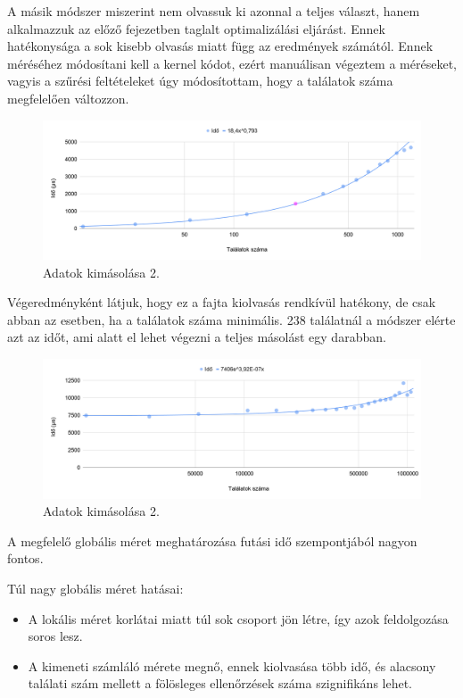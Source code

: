 A másik módszer miszerint nem olvassuk ki azonnal a teljes választ, hanem alkalmazzuk az előző fejezetben taglalt optimalizálási eljárást.
Ennek hatékonysága a sok kisebb olvasás miatt függ az eredmények számától. Ennek méréséhez módosítani kell a kernel kódot, ezért manuálisan végeztem a méréseket, vagyis a szűrési feltételeket úgy módosítottam, hogy a találatok száma megfelelően változzon.

\begin{figure}[h!]
\centering
\includegraphics[width=\textwidth]{images/outpuffer2.png}
\caption{Adatok kimásolása 2.}
\label{fig:schema}
\end{figure}

Végeredményként látjuk, hogy ez a fajta kiolvasás rendkívül hatékony, de csak abban az esetben, ha a találatok száma minimális.
238 találatnál a módszer elérte azt az időt, ami alatt el lehet végezni a teljes másolást egy darabban.
\begin{figure}[h!]
\centering
\includegraphics[width=\textwidth]{images/outpuffer3.png}
\caption{Adatok kimásolása 2.}
\label{fig:schema}
\end{figure}

\newpage
{}

A megfelelő globális méret meghatározása futási idő szempontjából nagyon fontos.

Túl nagy globális méret hatásai:
\begin{itemize}
\item A lokális méret korlátai miatt túl sok csoport jön létre, így azok feldolgozása soros lesz.
\item A kimeneti számláló mérete megnő, ennek kiolvasása több idő, és alacsony találati szám mellett a fölösleges ellenőrzések száma szignifikáns lehet.
\end{itemize}

